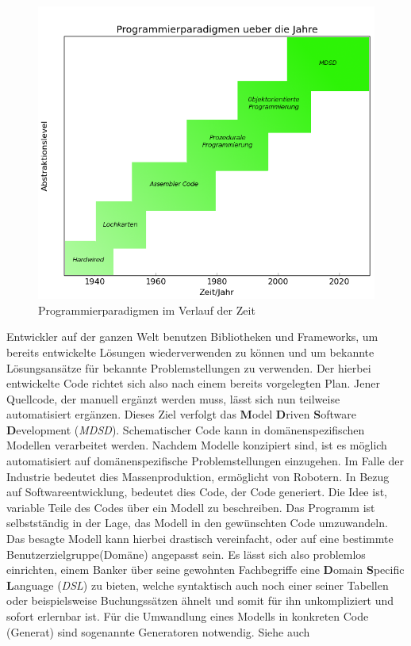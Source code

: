 \begin{figure}[h]
	\begin{center}
		\includegraphics[width = \textwidth]{Bilder/paradigmsInTime(matplotlib).png}
		\caption{Programmierparadigmen im Verlauf der Zeit}
		\label{paradigmnsintime}
	\end{center}
\end{figure}Entwickler auf der ganzen Welt benutzen Bibliotheken und Frameworks, um bereits entwickelte Lösungen wiederverwenden zu können und um bekannte Lösungsansätze für bekannte Problemstellungen zu verwenden. Der hierbei entwickelte Code richtet sich also nach einem bereits vorgelegten Plan. Jener Quellcode, der manuell ergänzt werden muss, lässt sich nun teilweise automatisiert ergänzen.  Dieses Ziel verfolgt das \textbf{M}odel \textbf{D}riven \textbf{S}oftware \textbf{D}evelopment (\textit{MDSD}). Schematischer Code kann in domänenspezifischen Modellen verarbeitet werden. Nachdem Modelle konzipiert sind, ist es möglich automatisiert auf domänenspezifische Problemstellungen einzugehen. Im Falle der Industrie bedeutet dies Massenproduktion, ermöglicht von Robotern. In Bezug auf Softwareentwicklung, bedeutet dies Code, der Code generiert. Die Idee ist, variable Teile des Codes über ein Modell zu beschreiben. Das Programm ist selbstständig in der Lage, das Modell in den gewünschten Code umzuwandeln. Das besagte Modell kann hierbei drastisch vereinfacht, oder auf eine bestimmte Benutzerzielgruppe(Domäne) angepasst sein. Es lässt sich also problemlos einrichten, einem Banker über seine gewohnten Fachbegriffe eine \textbf{D}omain \textbf{S}pecific \textbf{L}anguage (\textit{DSL}) zu bieten, welche syntaktisch auch noch einer seiner Tabellen oder beispielsweise Buchungssätzen ähnelt und somit für ihn unkompliziert und sofort erlernbar ist. Für die Umwandlung eines Modells in konkreten Code (Generat) sind sogenannte Generatoren notwendig. 
\linebreak 
Siehe auch 

